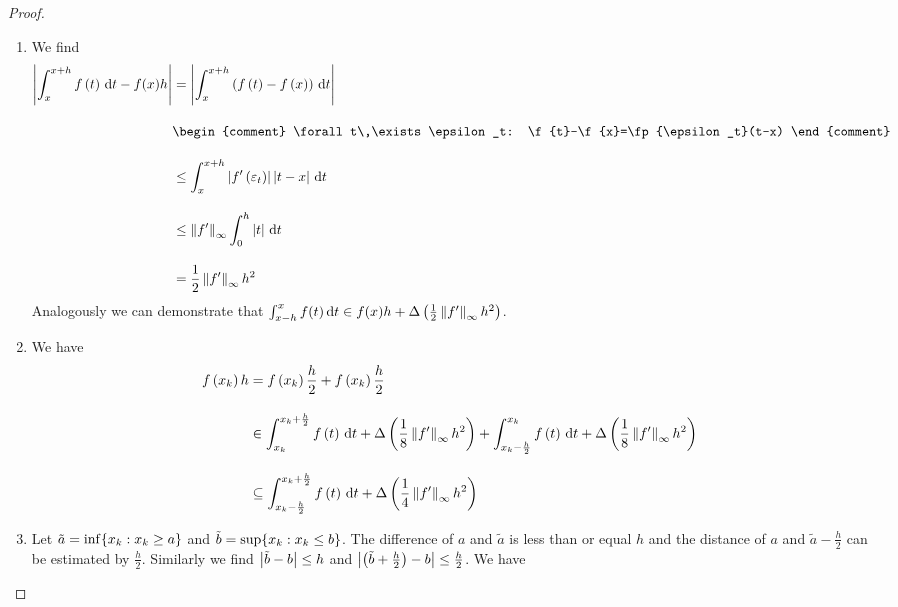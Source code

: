 \begin{proof}~
  \begin{enumerate}
    \item We find
      \begin{align}
        \abs{\int_x^{x+h} \f{t} \d{t} - f(x)h} &= \abs{\int_x^{x+h} \br{\f{t}-\f{x}} \d{t} } \bnl
        &
        \begin{comment}
          \forall t\,\exists \epsilon_t: \f{t}-\f{x}=\fp{\epsilon_t}(t-x)
        \end{comment} \bnl
        & \le \int_{x}^{x+h} \abs{\fp{\epsilon_t}} \abs{t-x} \d{t} \bnl
        & \le \snorm{f'} \int_{0}^{h} \abs{t} \d{t} \bnl
        & = \frac 12 \snorm{f'} h^2
      \end{align}
      Analogously we can demonstrate that $\int_{x-h}^x f(t) \,\mathrm d{t} \in f(x) h + \Delta\left( {\frac 12 \left\|{f'}\right\|_\infty h^2} \right)$.

    \item We have
      \begin{align}
        \f{\x} h & = \f{\x} \frac h2 + \f{\x} \frac h2 \bnl
        &\in \int_{\x}^{\x+\frac h2} \f{t}\d{t} + \bigabs{\frac 18 \snorm{f'} h^2} + \int_{\x-\frac h2}^{\x} \f{t}\d{t} + \bigabs{\frac 18 \snorm{f'} h^2} \bnl
        &\subseteq \int_{\x-\frac h2}^{\x+\frac h2} \f{t}\d{t} + \bigabs{\frac 14 \snorm{f'} h^2}
      \end{align}

    \item Let $\tilde a = \inf \{ x_{k} : x_{k} \ge a \}$ and $\tilde b = \sup \{ x_{k} : x_{k} \le b \}$. The difference of $a$ and $\tilde a$ is less than or equal $h$ and the distance of $a$ and $\tilde a - \frac h2$ can be estimated by $\frac h2$. Similarly we find $\left|{\tilde b-b}\right| \le h$ and $\left|{\left( {\tilde b+\frac h2} \right)-b}\right| \le \frac h2$. We have


\end{enumerate}
\end{proof}
